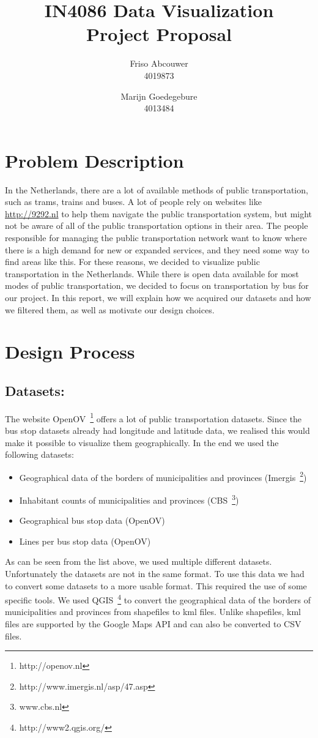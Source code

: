 \documentclass[a4paper,11pt]{article}
\title{IN4086 Data Visualization \\
Project Proposal \\ }
\author{
Friso Abcouwer \\
4019873 \\
\and
Marijn Goedegebure \\
4013484
}
\begin{document}
\maketitle{}
\newpage

\section{Problem Description}
In the Netherlands, there are a lot of available methods of public transportation, such as trams, trains and buses.
A lot of people rely on websites like \url{http://9292.nl} to help them navigate the public transportation system, but might not be aware of all of the public transportation options in their area. The people responsible for managing the public transportation network want to know where there is a high demand for new or expanded services, and they need some way to find areas like this.
For these reasons, we decided to visualize public transportation in the Netherlands. While there is open data available for most modes of public transportation, we decided to focus on transportation by bus for our project. In this report, we will explain how we acquired our datasets and how we filtered them, as well as motivate our design choices.  

\section{Design Process}
\subsection{Datasets:}
The website OpenOV~\footnote{http://openov.nl} offers a lot of public transportation datasets. Since the bus stop datasets already had longitude and latitude data, we realised this would make it possible to visualize them geographically. In the end we used the following datasets:
\begin{itemize}
\item Geographical data of the borders of municipalities and provinces (Imergis~\footnote{http://www.imergis.nl/asp/47.asp})
\item Inhabitant counts of municipalities and provinces (CBS~\footnote{www.cbs.nl})
\item Geographical bus stop data (OpenOV)
\item Lines per bus stop data (OpenOV)
\end{itemize}

As can be seen from the list above, we used multiple different datasets. Unfortunately the datasets are not in the same format. To use this data we had to convert some datasets to a more usable format. This required the use of some specific tools. We used QGIS~\footnote{http://www2.qgis.org/} to convert the geographical data of the borders of municipalities and provinces from shapefiles to kml files. Unlike shapefiles, kml files are supported by the Google Maps API and can also be converted to CSV files.
\end{document}
